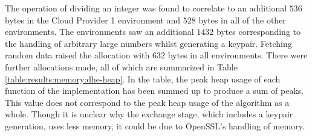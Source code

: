 The operation of dividing an integer was found to correlate to an additional $536$ bytes in the Cloud Provider 1 environment and $528$ bytes in all of the other environments. The environments saw an additional $1432$ bytes corresponding to the handling of arbitrary large numbers whilst generating a keypair. Fetching random data raised the allocation with $632$ bytes in all environments. There were further allocations made, all of which are summarized in Table \ref{table:results:memory:dhe-heap}. In the table, the peak heap usage of each function of the implementation has been summed up to produce a sum of peaks. This value does not correspond to the peak heap usage of the algorithm as a whole. Though it is unclear why the exchange stage, which includes a keypair generation, uses less memory, it could be due to OpenSSL's handling of memory.

